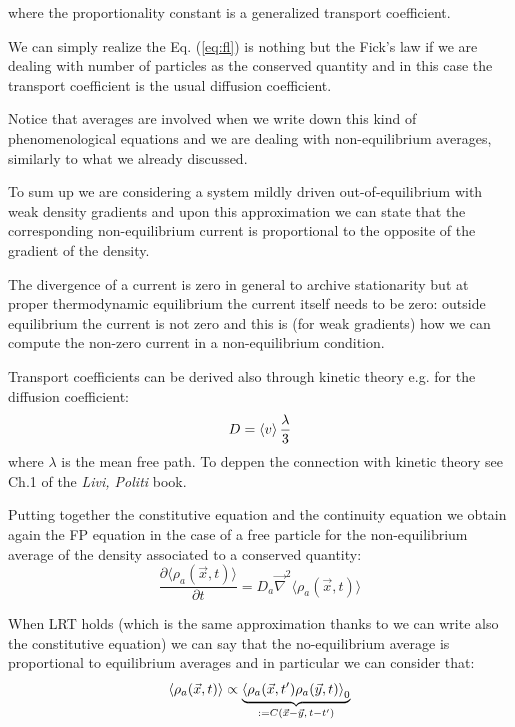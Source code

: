 \documentclass[\main/main.tex]{subfiles}
\begin{document}
where the proportionality constant is a generalized transport coefficient.

We can simply realize the Eq. (\ref{eq:fl}) is nothing but the Fick's law if we are dealing with number of particles as the conserved quantity and in this case the transport coefficient is the usual diffusion coefficient.

Notice that averages are involved when we write down this kind of phenomenological equations and we are dealing with non-equilibrium averages, similarly to what we already discussed.

To sum up we are considering a system mildly driven out-of-equilibrium with weak density gradients and upon this approximation we can state that the corresponding non-equilibrium current is proportional to the opposite of the gradient of the density.

The divergence of a current is zero in general to archive stationarity but at proper thermodynamic equilibrium the current itself needs to be zero: outside equilibrium the current is not zero and this is (for weak gradients) how we can compute the non-zero current in a non-equilibrium condition.

\begin{appr}
Transport coefficients can be derived also through kinetic theory e.g. for the diffusion coefficient:
\begin{equation*}
    D=\left\langle v \right\rangle\frac{\lambda}{3}
\end{equation*}
where $\lambda$ is the mean free path. To deppen the connection with kinetic theory see Ch.1 of the \textit{Livi, Politi} book.
\end{appr}

Putting together the constitutive equation and the continuity equation we obtain again the FP equation in the case of a free particle for the non-equilibrium average of the density associated to a conserved quantity:
\begin{equation}
    \frac{\partial\langle\rho_a(\vec{x}, t)\rangle}{\partial t}=D_a \vec{\nabla}^{2}\langle\rho_a(\vec{x}, t)\rangle
\end{equation}

When LRT holds (which is the same approximation thanks to we can write also the constitutive equation) we can say that the no-equilibrium average is proportional to equilibrium averages and in particular we can consider that:
\begin{equation}
    \left\langle \rho_a(\vec{x},t) \right\rangle \propto \underbrace{\left\langle \rho_a(\vec{x},t')\rho_a(\vec{y},t) \right\rangle_0}_{:=C(\vec{x}-\vec{y},\, t-t')}
\end{equation}
\end{document}
